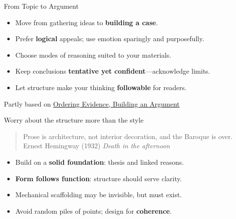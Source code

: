 \documentclass[aspectratio=169]{beamer}
\begin{document}
\begin{frame}{From Topic to Argument}
\begin{itemize}
  \item Move from gathering ideas to \textbf{building a case}.
  \item Prefer \textbf{logical} appeals; use emotion sparingly and purposefully.
  \item Choose modes of reasoning suited to your materials.
  \item Keep conclusions \textbf{tentative yet confident}—acknowledge limits.
  \item Let structure make your thinking \textbf{followable} for readers.
  \end{itemize}
  \vfill
Partly based on \href{https://mlpp.pressbooks.pub/writinghandbook/chapter/ordering-evidence-building-an-argument/}{Ordering Evidence, Building an Argument} \citep[Ch.~4]{writinghandbook}
\end{frame}



\begin{frame}{Worry about the structure more than the style}
  \begin{quote}
    Prose is architecture, not interior decoration, and the Baroque is over.
    \\
    \hfill \textnormal{Ernest Hemingway (1932) \textit{Death in the afternoon}}
  \end{quote}
\begin{itemize}
  \item Build on a \textbf{solid foundation}: thesis and linked reasons.
  \item \textbf{Form follows function}: structure should serve clarity.
  \item Mechanical scaffolding may be invisible, but must exist.
  \item Avoid random piles of points; design for \textbf{coherence}.
  \end{itemize}
 
\end{frame}
\end{document}
